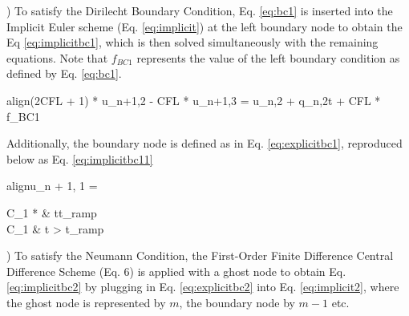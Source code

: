 \documentclass[10pt, letter, showtrims]{extarticle}
\newcommand{\boxedeq}[2]{\begin{empheq}[box={\fboxsep=6pt\fbox}]{align}\label{#1}#2\end{empheq}}
\begin{document}
		) To satisfy the Dirilecht Boundary Condition, Eq. \ref{eq:bc1} is inserted into the Implicit Euler scheme (Eq. \ref{eq:implicit}) at the left boundary node to obtain the Eq \ref{eq:implicitbc1}, which is then solved simultaneously with the remaining equations. Note that $f_{BC1}$ represents the value of the left boundary condition as defined by Eq. \ref{eq:bc1}.
%		 
%		
%    		
       					
		\boxedeq{eq:implicitbc1}{(2CFL + 1) * u_{n+1,2} - CFL * u_{n+1,3} = u_{n,2} + q_{n,2}\Delta t + CFL * f_{BC1}} 
		
		\noindent
		Additionally, the boundary node is defined as in Eq. \ref{eq:explicitbc1}, reproduced below as Eq. \ref{eq:implicitbc11}
		
		\boxedeq{eq:implicitbc11}{u_{n + 1, 1} = \begin{cases} 
          			C_{1} * \frac{t}{t_{ramp}} & t\leq t_{ramp} \\
          			C_{1}                      & t > t_{ramp}
       			\end{cases}}
		
		) To satisfy the Neumann Condition, the First-Order Finite Difference Central Difference Scheme (Eq. 6) is applied with a ghost node to obtain Eq. \ref{eq:implicitbc2} by plugging in Eq. \ref{eq:explicitbc2} into Eq. \ref{eq:implicit2}, where the ghost node is represented by $m$, the boundary node by $m - 1$ etc.
		
\end{document}
